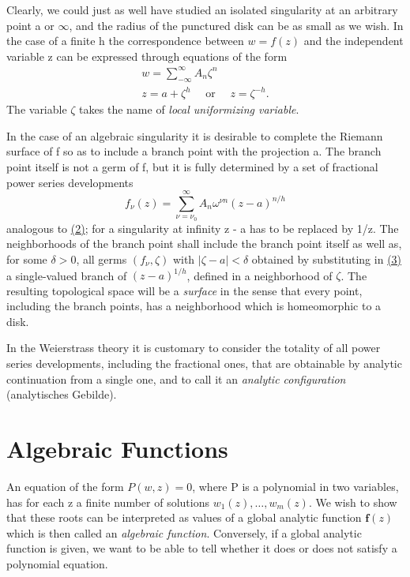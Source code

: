 Clearly, we could just as well have studied an isolated singularity at an arbitrary point a or $\infty$, and the radius of the punctured disk can be as small as we wish. In the case of a finite h the correspondence between $w = f(z)$ and the independent variable z can be expressed through equations of the form
\begin{equation*}
\begin{array}{l} w = \sum_ {- \infty} ^ {\infty} A _ {n} \zeta^ {n} \\ z = a + \zeta^ {h} \quad \text { or } \quad z = \zeta^ {- h}. \end{array}
\end{equation*}
The variable $\zeta$ takes the name of \emph{local uniformizing variable}.

In the case of an algebraic singularity it is desirable to complete the Riemann surface of f so as to include a branch point with the projection a. The branch point itself is not a germ of f, but it is fully determined by a set of fractional power series developments
\begin{equation*}
f _ {\nu} (z) = \sum_ {\nu = \nu_ {0}} ^ {\infty} A _ {n} \omega^ {\nu n} (z - a) ^ {n / h}\tag{3}\label{eq:8.3}
\end{equation*}
analogous to \hyperref[eq:8.2]{(2)}; for a singularity at infinity z - a has to be replaced by 1/z. The neighborhoods of the branch point shall include the branch point itself as well as, for some $\delta > 0$, all germs $(f_{\nu}, \zeta)$ with $|\zeta - a| < \delta$ obtained by substituting in \hyperref[eq:8.3]{(3)} a single-valued branch of $(z - a)^{1/h}$, defined in a neighborhood of $\zeta$. The resulting topological space will be a \emph{surface} in the sense that every point, including the branch points, has a neighborhood which is homeomorphic to a disk.

In the Weierstrass theory it is customary to consider the totality of all power series developments, including the fractional ones, that are obtainable by analytic continuation from a single one, and to call it an \emph{analytic configuration} (analytisches Gebilde).

\setcounter{section}{1}\section{Algebraic Functions}\label{sec:8.2}
An equation of the form $P(w,z)=0$, where P is a polynomial in two variables, has for each z a finite number of solutions $w_{1}(z),\ldots,w_{m}(z)$. We wish to show that these roots can be interpreted as values of a global analytic function $\mathbf{f}(z)$ which is then called an \emph{algebraic function}. Conversely, if a global analytic function is given, we want to be able to tell whether it does or does not satisfy a polynomial equation.

